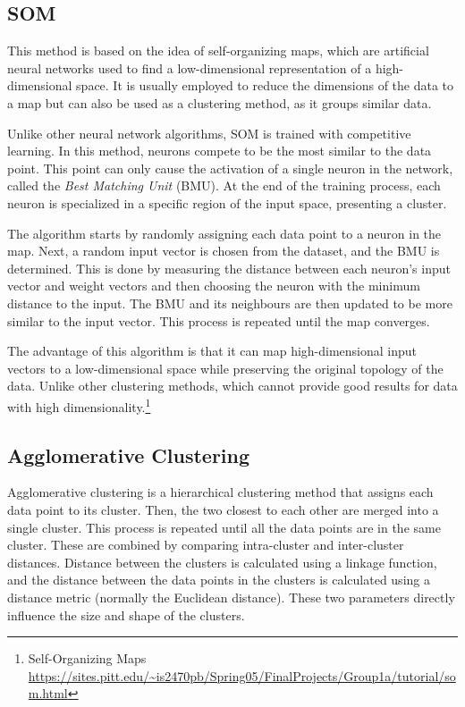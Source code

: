 \subsection{SOM}\label{sec:som}
This method is based on the idea of self-organizing maps, which are artificial neural networks used to find a low-dimensional representation of a high-dimensional space. It is usually employed to reduce the dimensions of the data to a map but can also be used as a clustering method, as it groups similar data. 

Unlike other neural network algorithms, SOM is trained with competitive learning. In this method, neurons compete to be the most similar to the data point. This point can only cause the activation of a single neuron in the network, called the \textit{Best Matching Unit} (BMU). At the end of the training process, each neuron is specialized in a specific region of the input space, presenting a cluster.

The algorithm starts by randomly assigning each data point to a neuron in the map. Next, a random input vector is chosen from the dataset, and the BMU is determined. This is done by measuring the distance between each neuron's input vector and weight vectors and then choosing the neuron with the minimum distance to the input. The BMU and its neighbours are then updated to be more similar to the input vector. This process is repeated until the map converges. 


The advantage of this algorithm is that it can map high-dimensional input vectors to a low-dimensional space while preserving the original topology of the data. Unlike other clustering methods, which cannot provide good results for data with high dimensionality.\footnote{Self-Organizing Maps \url{https://sites.pitt.edu/~is2470pb/Spring05/FinalProjects/Group1a/tutorial/som.html}}

\subsection{Agglomerative Clustering}\label{sec:aglomerative}
Agglomerative clustering is a hierarchical clustering method that assigns each data point to its cluster. Then, the two closest to each other are merged into a single cluster. This process is repeated until all the data points are in the same cluster. These are combined by comparing intra-cluster and inter-cluster distances. Distance between the clusters is calculated using a linkage function, and the distance between the data points in the clusters is calculated using a distance metric (normally the Euclidean distance). These two parameters directly influence the size and shape of the clusters.

